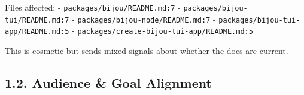 Files affected: - \texttt{p\allowbreak{}a\allowbreak{}c\allowbreak{}k\allowbreak{}a\allowbreak{}g\allowbreak{}e\allowbreak{}s\allowbreak{}/\allowbreak{}b\allowbreak{}i\allowbreak{}j\allowbreak{}o\allowbreak{}u\allowbreak{}/\allowbreak{}R\allowbreak{}E\allowbreak{}A\allowbreak{}D\allowbreak{}M\allowbreak{}E\allowbreak{}.\allowbreak{}m\allowbreak{}d\allowbreak{}:\allowbreak{}7} - \texttt{p\allowbreak{}a\allowbreak{}c\allowbreak{}k\allowbreak{}a\allowbreak{}g\allowbreak{}e\allowbreak{}s\allowbreak{}/\allowbreak{}b\allowbreak{}i\allowbreak{}j\allowbreak{}o\allowbreak{}u\allowbreak{}-\allowbreak{}t\allowbreak{}u\allowbreak{}i\allowbreak{}/\allowbreak{}R\allowbreak{}E\allowbreak{}A\allowbreak{}D\allowbreak{}M\allowbreak{}E\allowbreak{}.\allowbreak{}m\allowbreak{}d\allowbreak{}:\allowbreak{}7} - \texttt{p\allowbreak{}a\allowbreak{}c\allowbreak{}k\allowbreak{}a\allowbreak{}g\allowbreak{}e\allowbreak{}s\allowbreak{}/\allowbreak{}b\allowbreak{}i\allowbreak{}j\allowbreak{}o\allowbreak{}u\allowbreak{}-\allowbreak{}n\allowbreak{}o\allowbreak{}d\allowbreak{}e\allowbreak{}/\allowbreak{}R\allowbreak{}E\allowbreak{}A\allowbreak{}D\allowbreak{}M\allowbreak{}E\allowbreak{}.\allowbreak{}m\allowbreak{}d\allowbreak{}:\allowbreak{}7} - \texttt{p\allowbreak{}a\allowbreak{}c\allowbreak{}k\allowbreak{}a\allowbreak{}g\allowbreak{}e\allowbreak{}s\allowbreak{}/\allowbreak{}b\allowbreak{}i\allowbreak{}j\allowbreak{}o\allowbreak{}u\allowbreak{}-\allowbreak{}t\allowbreak{}u\allowbreak{}i\allowbreak{}-\allowbreak{}a\allowbreak{}p\allowbreak{}p\allowbreak{}/\allowbreak{}R\allowbreak{}E\allowbreak{}A\allowbreak{}D\allowbreak{}M\allowbreak{}E\allowbreak{}.\allowbreak{}m\allowbreak{}d\allowbreak{}:\allowbreak{}5} - \texttt{p\allowbreak{}a\allowbreak{}c\allowbreak{}k\allowbreak{}a\allowbreak{}g\allowbreak{}e\allowbreak{}s\allowbreak{}/\allowbreak{}c\allowbreak{}r\allowbreak{}e\allowbreak{}a\allowbreak{}t\allowbreak{}e\allowbreak{}-\allowbreak{}b\allowbreak{}i\allowbreak{}j\allowbreak{}o\allowbreak{}u\allowbreak{}-\allowbreak{}t\allowbreak{}u\allowbreak{}i\allowbreak{}-\allowbreak{}a\allowbreak{}p\allowbreak{}p\allowbreak{}/\allowbreak{}R\allowbreak{}E\allowbreak{}A\allowbreak{}D\allowbreak{}M\allowbreak{}E\allowbreak{}.\allowbreak{}m\allowbreak{}d\allowbreak{}:\allowbreak{}5}

This is cosmetic but sends mixed signals about whether the docs are current.

\subsection{1.2. Audience \& Goal Alignment}\label{record-412-audience-goal-alignment}

